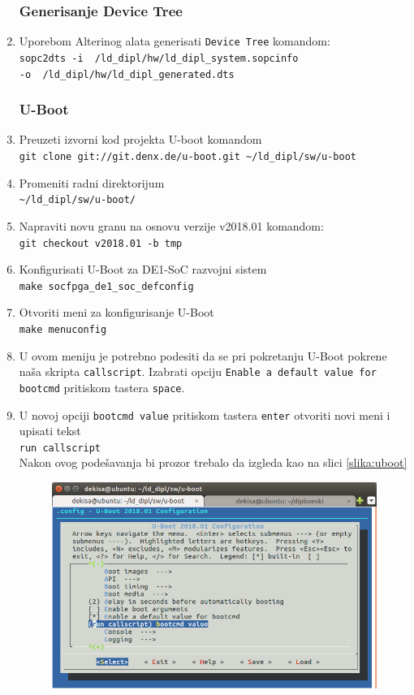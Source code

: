 \begin{enumerate}
\subsubsection{Generisanje Device Tree}
\item Uporebom Alterinog alata generisati \texttt{Device Tree} komandom: \\
\texttt{sopc2dts -i ~/ld\_dipl/hw/ld\_dipl\_system.sopcinfo \\-o ~/ld\_dipl/hw/ld\_dipl\_generated.dts}

\subsubsection{U-Boot}
\item Preuzeti izvorni kod projekta U-boot komandom\\ \texttt{git clone git://git.denx.de/u-boot.git \textasciitilde/ld\_dipl/sw/u-boot}
\item Promeniti radni direktorijum\\ \texttt{\textasciitilde/ld\_dipl/sw/u-boot/}
\item Napraviti novu granu na osnovu verzije v2018.01 komandom:\\ \texttt{git checkout v2018.01 -b tmp}
\item Konfigurisati U-Boot za DE1-SoC razvojni sistem\\ \texttt{make socfpga\_de1\_soc\_defconfig}
\item Otvoriti meni za konfigurisanje U-Boot\\ \texttt{make menuconfig}
\item U ovom meniju je potrebno podesiti da se pri pokretanju U-Boot pokrene naša skripta \texttt{callscript}. Izabrati opciju \texttt{Enable a default value for bootcmd} pritiskom tastera \texttt{space}.
\item U novoj opciji \texttt{bootcmd value} pritiskom tastera \texttt{enter} otvoriti novi meni i upisati tekst\\ \texttt{run callscript}\\
Nakon ovog podešavanja bi prozor trebalo da izgleda kao na slici \ref{slika:uboot}
\begin{figure}[h!]
\centering
\includegraphics[scale=0.6, trim={0 0 10 60},clip]{img/uboot.png}

\end{figure}
\end{enumerate}
